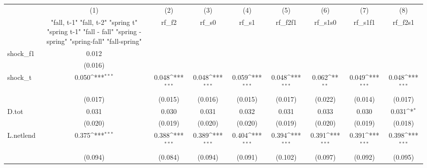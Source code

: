 {
\def\sym#1{\ifmmode^{#1}\else\(^{#1}\)\fi}
\begin{tabular}{l*{8}{c}}
\toprule
            &\multicolumn{1}{c}{(1)}&\multicolumn{1}{c}{(2)}&\multicolumn{1}{c}{(3)}&\multicolumn{1}{c}{(4)}&\multicolumn{1}{c}{(5)}&\multicolumn{1}{c}{(6)}&\multicolumn{1}{c}{(7)}&\multicolumn{1}{c}{(8)}\\
            &\multicolumn{1}{c}{  "fall, t-1" "fall, t-2" "spring t" "spring t-1"  "fall - fall" "spring - spring" "spring-fall" "fall-spring" }&\multicolumn{1}{c}{rf\_f2}&\multicolumn{1}{c}{rf\_s0}&\multicolumn{1}{c}{rf\_s1}&\multicolumn{1}{c}{rf\_f2f1}&\multicolumn{1}{c}{rf\_s1s0}&\multicolumn{1}{c}{rf\_s1f1}&\multicolumn{1}{c}{rf\_f2s1}\\
\midrule
shock\_f1    &       0.012         &                     &                     &                     &                     &                     &                     &                     \\
            &     (0.016)         &                     &                     &                     &                     &                     &                     &                     \\
\addlinespace
shock\_t     &       0.050\sym{***}&       0.048\sym{***}&       0.048\sym{***}&       0.059\sym{***}&       0.048\sym{***}&       0.062\sym{**} &       0.049\sym{***}&       0.048\sym{***}\\
            &     (0.017)         &     (0.015)         &     (0.016)         &     (0.015)         &     (0.017)         &     (0.022)         &     (0.014)         &     (0.017)         \\
\addlinespace
D.tot       &       0.031         &       0.030         &       0.031         &       0.032         &       0.031         &       0.033         &       0.030         &       0.031\sym{*}  \\
            &     (0.020)         &     (0.019)         &     (0.020)         &     (0.020)         &     (0.019)         &     (0.020)         &     (0.019)         &     (0.018)         \\
\addlinespace
L.netlend   &       0.375\sym{***}&       0.388\sym{***}&       0.389\sym{***}&       0.404\sym{***}&       0.394\sym{***}&       0.391\sym{***}&       0.391\sym{***}&       0.398\sym{***}\\
            &     (0.094)         &     (0.084)         &     (0.094)         &     (0.091)         &     (0.102)         &     (0.097)         &     (0.092)         &     (0.095)         \\

\end{tabular}}
